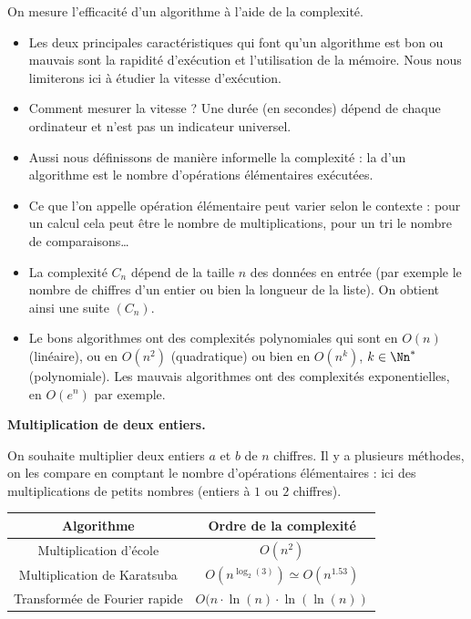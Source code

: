 \documentclass[11pt,class=report,crop=false]{standalone}
\begin{document}

\begin{cours}
On mesure l'efficacité d'un algorithme à l'aide de la complexité. 

\begin{itemize}
	\item Les deux principales caractéristiques qui font qu'un algorithme est bon ou mauvais sont la rapidité d'exécution et l'utilisation de la mémoire. Nous nous limiterons ici à étudier la vitesse d'exécution. 
	
	\item Comment mesurer la vitesse ? Une durée (en secondes) dépend de chaque ordinateur et n'est pas un indicateur universel. 
	
	\item Aussi nous définissons de manière informelle la complexité : la  d'un algorithme est le nombre d'opérations élémentaires exécutées.
	
	\item Ce que l'on appelle \og{}opération élémentaire\fg{} peut varier selon le contexte : pour un calcul cela peut être le nombre de multiplications, pour un tri le nombre de comparaisons\ldots
	
	\item La complexité $C_n$ dépend de la taille $n$ des données en entrée (par exemple le nombre de chiffres d'un entier ou bien la longueur de la liste). On obtient ainsi une suite $(C_n)$.
	
	\item Le bons algorithmes ont des complexités polynomiales qui sont en $O(n)$ (linéaire), ou en $O(n^2)$ (quadratique) ou bien en $O(n^k)$, $k\in\Nn^*$ (polynomiale). Les mauvais algorithmes ont des complexités exponentielles, en $O(e^n)$ par exemple.
\end{itemize}

\bigskip

\textbf{Multiplication de deux entiers.}

On souhaite multiplier deux entiers $a$ et $b$ de $n$ chiffres.
Il y a plusieurs méthodes, on les compare en comptant le nombre d'opérations élémentaires : ici des multiplications de petits nombres (entiers à $1$ ou $2$ chiffres).

\begin{center}
	\begin{tabular}{|c|c|}\hline
		Algorithme  & Ordre de la complexité \\ \hline\hline
		Multiplication d'école & $O(n^2)$ \\ \hline
		Multiplication de Karatsuba & $O(n^{\log_2(3)}) \simeq O(n^{1.53})$  \\ \hline
		Transformée de Fourier rapide & $O(n\cdot \ln(n) \cdot \ln(\ln(n))$  \\\hline
	\end{tabular}
\end{center}  


\end{cours}
\end{document}
